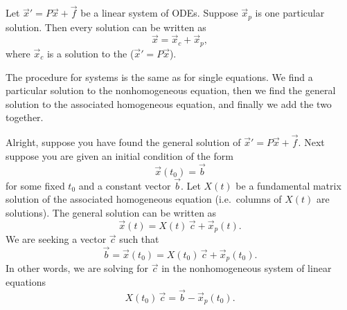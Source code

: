 \documentclass{ximera}
\begin{document}
\begin{theorem}{}
    Let ${\vec{x}}' = P\vec{x} + \vec{f}$ be a linear system of ODEs. Suppose $\vec{x}_p$ is one particular solution.  Then every solution can be written as
    \begin{equation*}
        \vec{x} = \vec{x}_c + \vec{x}_p ,
    \end{equation*}
    where $\vec{x}_c$ is a solution to the  (${\vec{x}}' = P\vec{x}$).
\end{theorem}

The procedure for systems is the same as for single equations. We find a particular solution to the nonhomogeneous equation, then we find the general solution to the associated homogeneous equation, and finally we add the two together.


Alright, suppose you have found the general solution of ${\vec{x}}' = P\vec{x} + \vec{f}$.  Next suppose you are given an initial condition of the form
\begin{equation*}
    \vec{x}(t_0) = \vec{b}
\end{equation*}
for some fixed $t_0$ and a constant vector $\vec{b}$.  Let $X(t)$ be a fundamental matrix solution of the associated homogeneous equation (i.e.\ columns of $X(t)$ are solutions).  The general solution can be written as
\begin{equation*}
    \vec{x}(t) = X(t)\,\vec{c} + \vec{x}_p(t).
\end{equation*}
We are seeking a vector $\vec{c}$ such that
\begin{equation*}
    \vec{b} = \vec{x}(t_0) = X(t_0)\,\vec{c} + \vec{x}_p(t_0).
\end{equation*}
In other words, we are solving for $\vec{c}$ in the nonhomogeneous system of linear equations
\begin{equation*}
    X(t_0)\,\vec{c} = \vec{b} - \vec{x}_p(t_0) .
\end{equation*}
\end{document}
